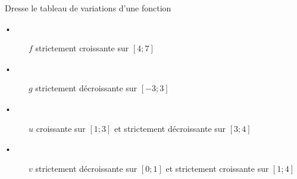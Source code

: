 
Dresse le tableau de variations d'une fonction
\begin{description}
\item[•] $f$ strictement croissante sur $[4;7]$
\item[•] $g$ strictement décroissante sur $[-3;3]$
\item[•] $u$ croissante sur $[1;3]$ et strictement décroissante sur $[3;4]$
\item[•] $v$ strictement décroissante sur $[0;1]$ et strictement croissante sur $[1;4]$
\end{description}